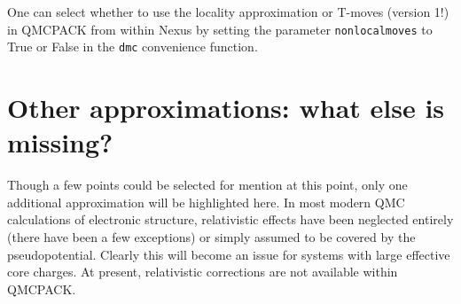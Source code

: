 \documentclass[oneside,11pt]{memoir}
\numberwithin{equation}{section}
\begin{document}
One can select whether to use the locality approximation or T-moves 
(version 1!) in QMCPACK from within Nexus by setting the 
parameter \texttt{nonlocalmoves} to True or False in the \texttt{dmc} 
convenience function.


\section{Other approximations: what else is missing?}
Though a few points could be selected for mention at this point, only one 
additional approximation will be highlighted here.  In most modern QMC 
calculations of electronic structure, relativistic effects have been neglected 
entirely (there have been a few exceptions) or simply assumed to be covered 
by the pseudopotential.  Clearly this will become an issue for systems with 
large effective core charges.  At present, relativistic corrections are not 
available within QMCPACK.




\backmatter


\end{document}
